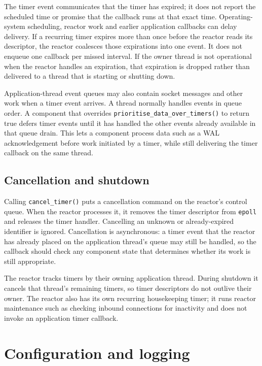 The timer event communicates that the timer has expired; it does not report
the scheduled time or promise that the callback runs at that exact time.
Operating-system scheduling, reactor work and earlier application callbacks
can delay delivery. If a recurring timer expires more than once before the
reactor reads its descriptor, the reactor coalesces those expirations into
one event. It does not enqueue one callback per missed interval. If the owner
thread is not operational when the reactor handles an expiration, that
expiration is dropped rather than delivered to a thread that is starting or
shutting down.

Application-thread event queues may also contain socket messages and other
work when a timer event arrives. A thread normally handles events in queue
order. A component that overrides
\texttt{prioritise\_\allowbreak data\_\allowbreak over\_\allowbreak timers()} to
return true defers timer events until it has handled the other events already
available in that queue drain. This lets a component process data such as a
WAL acknowledgement before work initiated by a timer, while still delivering
the timer callback on the same thread.

\subsection{Cancellation and shutdown}

Calling \texttt{cancel\_timer()} puts a cancellation command on the reactor's
control queue. When the reactor processes it, it removes the timer descriptor
from \texttt{epoll} and releases the timer handler. Cancelling an unknown or
already-expired identifier is ignored. Cancellation is asynchronous: a timer
event that the reactor has already placed on the application thread's queue
may still be handled, so the callback should check any component state that
determines whether its work is still appropriate.

The reactor tracks timers by their owning application thread. During shutdown
it cancels that thread's remaining timers, so timer descriptors do not outlive
their owner. The reactor also has its own recurring housekeeping timer; it
runs reactor maintenance such as checking inbound connections for inactivity
and does not invoke an application timer callback.

\section{Configuration and logging}
\label{sec:fw_configuration}

